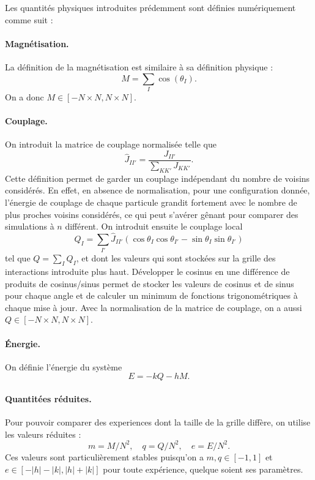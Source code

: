 \documentclass[a4paper, 11pt]{article}
\begin{document}
Les quantités physiques introduites prédemment sont définies numériquement comme suit :
\paragraph{Magnétisation.}
La définition de la magnétisation est similaire à sa définition physique : 
\[
M = \sum_I \cos(\theta_I).
\] On a donc $M \in [-N\times N, N \times N]$.
\paragraph{Couplage.}
On introduit la matrice de couplage normalisée telle que
\begin{equation*}
    \hat{J}_{II'} = \frac{J_{II'}}{\sum_{KK'} J_{KK'} }.
\end{equation*}
Cette définition permet de garder un couplage indépendant du nombre de voisins considérés.  En
effet, en absence de normalisation, pour une configuration donnée, l'énergie de couplage de chaque
particule grandit fortement avec le nombre de plus proches voisins considérés, ce qui peut s'avérer
gênant pour comparer des simulations à $n$ différent.  On introduit ensuite le couplage local 
\begin{equation*}
    Q_I = \sum_{I'} \hat{J}_{II'} ( \cos \theta_I \cos \theta_{I'}  -
    \sin \theta_I \sin \theta_{I'} )
\end{equation*}
tel que $Q = \sum_I Q_I$, et dont les valeurs qui sont stockées sur la grille des interactions
introduite plus haut. Développer le cosinus en une différence de produits de cosinus/sinus permet de
stocker les valeurs de cosinus et de sinus pour chaque angle et de calculer un minimum de fonctions
trigonométriques à chaque mise à jour. Avec la normalisation de la matrice de couplage, on a aussi
$Q \in [-N\times N, N \times N]$.
\paragraph{Énergie.} On définie l'énergie du système 
\begin{equation*}
    E = -k Q - h M.
\end{equation*}

\paragraph{Quantitées réduites.} Pour pouvoir comparer des experiences dont la taille de la grille
diffère, on utilise les valeurs réduites :
\begin{equation*}
    m = M / N^2, \quad q = Q / N^2, \quad e = E / N^2.
\end{equation*}
Ces valeurs sont particulièrement stables puisqu'on a $m,q \in [-1, 1]$ et $e \in [-|h|-|k|,
|h|+|k|]$ pour toute expérience, quelque soient ses paramètres. 
\end{document}
